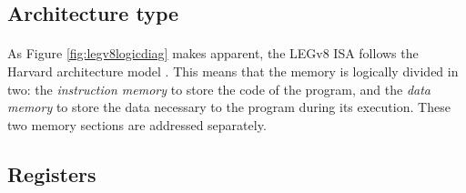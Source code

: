 \subsection{Architecture type}
\paragraph{}
As Figure \ref{fig:legv8logicdiag} makes apparent, the LEGv8 ISA follows the Harvard architecture model \cite{harvardarchweb}.  This means that the memory is logically divided in two: the \emph{instruction memory} to store the code of the program, and the \emph{data memory} to store the data necessary to the program during its execution. These two memory sections are addressed separately.
\subsection{Registers}\label{chap:chap1registers}
